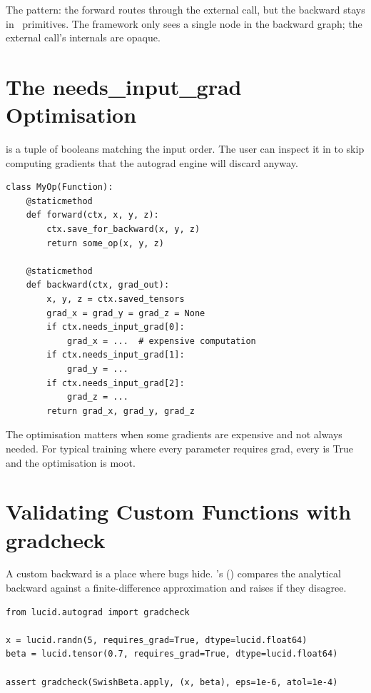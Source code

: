 The pattern: the forward routes through the external call, but
the backward stays in \Lucid\ primitives. The framework only sees
a single  node in the backward graph; the
external call's internals are opaque.

\section{The needs\_input\_grad Optimisation}
\label{sec:custom_functions:needs_input_grad}

 is a tuple of booleans matching the
input order. The user can inspect it in  to skip
computing gradients that the autograd engine will discard anyway.

\begin{lstlisting}[style=lucid,language=LucidPython]
class MyOp(Function):
    @staticmethod
    def forward(ctx, x, y, z):
        ctx.save_for_backward(x, y, z)
        return some_op(x, y, z)

    @staticmethod
    def backward(ctx, grad_out):
        x, y, z = ctx.saved_tensors
        grad_x = grad_y = grad_z = None
        if ctx.needs_input_grad[0]:
            grad_x = ...  # expensive computation
        if ctx.needs_input_grad[1]:
            grad_y = ...
        if ctx.needs_input_grad[2]:
            grad_z = ...
        return grad_x, grad_y, grad_z
\end{lstlisting}

The optimisation matters when some gradients are expensive and
not always needed. For typical training where every parameter
requires grad, every  is True and the
optimisation is moot.

\section{Validating Custom Functions with gradcheck}
\label{sec:custom_functions:gradcheck}

A custom backward is a place where bugs hide. \Lucid's
 () compares the analytical
backward against a finite-difference approximation and raises if
they disagree.

\begin{lstlisting}[style=lucid,language=LucidPython]
from lucid.autograd import gradcheck

x = lucid.randn(5, requires_grad=True, dtype=lucid.float64)
beta = lucid.tensor(0.7, requires_grad=True, dtype=lucid.float64)

assert gradcheck(SwishBeta.apply, (x, beta), eps=1e-6, atol=1e-4)
\end{lstlisting}

